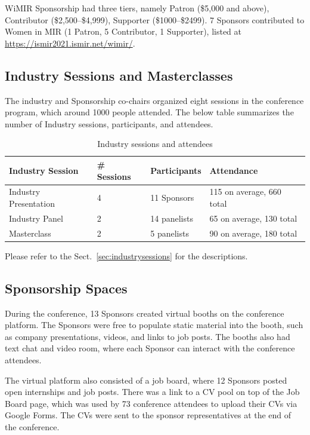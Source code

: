 \documentclass[%
10pt,								%
]
{scrartcl}
\begin{document}
        WiMIR Sponsorship had three tiers, namely Patron (\$5,000 and above), Contributor (\$2,500--\$4,999), Supporter (\$1000--\$2499). 7 Sponsors contributed to Women in MIR (1 Patron, 5 Contributor, 1 Supporter), listed at \href{https://ismir2021.ismir.net/wimir/}{https://ismir2021.ismir.net/wimir/}. 
        
        
    \subsection{Industry Sessions and Masterclasses}
        The industry and Sponsorship co-chairs organized eight sessions in the conference program, which around 1000 people attended. The below table summarizes the number of Industry sessions, participants, and attendees. 
        
        
        \begin{table}
            \begin{tabular}{l|l|l|l}
                \textbf{Industry Session} & \textbf{\# Sessions} & \textbf{Participants} & \textbf{Attendance}\\ \hline
                
                Industry Presentation & 4 & 11 Sponsors & 115 on average, 660 total\\
                Industry Panel & 2 & 14 panelists & 65 on average, 130 total\\
                Masterclass & 2 & 5 panelists & 90 on average, 180 total\\
            
            \end{tabular}
            \caption{Industry sessions and attendees}
            \label{tab:IndustrySessions}
        \end{table}
        Please refer to the Sect.~\ref{sec:industrysessions} for the descriptions.
        
    \subsection{Sponsorship Spaces}
        During the conference, 13 Sponsors created virtual booths on the conference platform. The Sponsors were free to populate static material into the booth, such as company presentations, videos, and links to job posts. The booths also had text chat and video room, where each Sponsor can interact with the conference attendees.

        The virtual platform also consisted of a job board, where 12 Sponsors posted open internships and job posts. There was a link to a CV pool on top of the Job Board page, which was used by 73 conference attendees to upload their CVs via Google Forms. The CVs were sent to the sponsor representatives at the end of the conference. 
        
\end{document}
